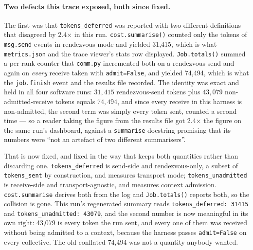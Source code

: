 \documentclass[11pt]{article}
\begin{document}
\paragraph{Two defects this trace exposed, both since fixed.} The first was that
\texttt{tokens\_deferred} was reported with two different definitions that disagreed by
2.4$\times$ in this run. \texttt{cost.summarise()} counted only the tokens of \texttt{msg.send}
events in rendezvous mode and yielded 31{,}415, which is what \texttt{metrics.json} and the trace
viewer's stats row displayed. \texttt{Job.totals()} summed a per-rank counter that \texttt{comm.py}
incremented both on a rendezvous send and again on \emph{every} receive taken with
\texttt{admit=False}, and yielded 74{,}494, which is what the \texttt{job.finish} event and the
results file recorded. The identity was exact and held in all four software runs: $31{,}415$
rendezvous-send tokens plus $43{,}079$ non-admitted-receive tokens equals $74{,}494$, and since
every receive in this harness is non-admitted, the second term was simply every token sent,
counted a second time --- so a reader taking the figure from the results file got 2.4$\times$ the
figure on the same run's dashboard, against a \texttt{summarise} docstring promising that its
numbers were ``not an artefact of two different summarisers''.

That is now fixed, and fixed in the way that keeps both quantities rather than discarding one.
\texttt{tokens\_deferred} is send-side and rendezvous-only, a subset of \texttt{tokens\_sent} by
construction, and measures transport mode; \texttt{tokens\_unadmitted} is receive-side and
transport-agnostic, and measures context admission. \texttt{cost.summarise} derives both from the
log and \texttt{Job.totals()} reports both, so the collision is gone. This run's regenerated
summary reads \texttt{tokens\_deferred: 31415} and \texttt{tokens\_unadmitted: 43079}, and the
second number is now meaningful in its own right: 43{,}079 is every token the run sent, and every
one of them was received without being admitted to a context, because the harness passes
\texttt{admit=False} on every collective. The old conflated 74{,}494 was not a quantity anybody
wanted.
\end{document}
